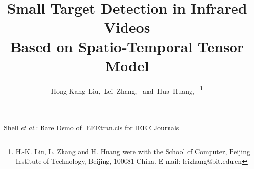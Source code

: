\documentclass[journal]{IEEEtran}
\begin{document}
\title{Small Target Detection in Infrared Videos \\Based on Spatio-Temporal Tensor Model}
%
%
%

\author{Hong-Kang~Liu,~Lei~Zhang,~
        and~Hua~Huang,~%
\thanks{H.-K. Liu, L. Zhang and H. Huang were with the School of Computer, Beijing Institute of Technology, Beijing, 100081 China. E-mail: leizhang@bit.edu.cn}%
}

%
%



%
{Shell \MakeLowercase{\textit{et al.}}: Bare Demo of IEEEtran.cls for IEEE Journals}
%
\end{document}

